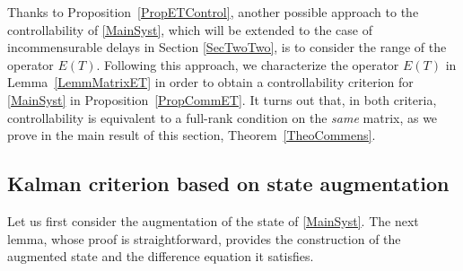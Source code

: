 \documentclass[10pt]{amsart}
\theoremstyle{plain}
\theoremstyle{definition}
\begin{document}
Thanks to Proposition~\ref{PropETControl}, another possible approach to the controllability of \eqref{MainSyst}, which will be extended to the case of incommensurable delays in Section \ref{SecTwoTwo}, is to consider the range of the operator $E(T)$. Following this approach, we characterize the operator $E(T)$ in Lemma~\ref{LemmMatrixET} in order to obtain a controllability criterion for \eqref{MainSyst} in Proposition~\ref{PropCommET}. It turns out that, in both criteria, controllability is equivalent to a full-rank condition on the \emph{same} matrix, as we prove in the main result of this section, Theorem~\ref{TheoCommens}.

\subsection{Kalman criterion based on state augmentation}

Let us first consider the augmentation of the state of \eqref{MainSyst}. The next lemma, whose proof is straightforward, provides the construction of the augmented state and the difference equation it satisfies.
\end{document}
